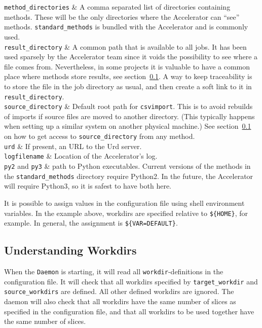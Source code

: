 \RPtwo \texttt{method\_directories} & A comma separated list of
directories containing methods.  These will be the only directories
where the Accelerator can ``see'' methods.  \texttt{standard\_methods}
is bundled with the Accelerator and is commonly used.\\[1ex]

\RPtwo \texttt{result\_directory} & A common path that is available to all
jobs.  It has been used sparsely by the Accelerator team since it
voids the possibility to see where a file comes from.  Nevertheless,
in some projects it is valuable to have a common place where methods
store results, see section~\ref{}.  A way to keep traceability is to
store the file in the job directory as usual, and then create a soft
link to it in \texttt{result\_directory}.\\[1ex]

\RPtwo \texttt{source\_directory} & Default root path for
\texttt{csvimport}.  This is to avoid rebuilds of imports if source
files are moved to another directory.  (This typically happens when
setting up a similar system on another physical machine.)  See
section~\ref{} on how to get access to \texttt{source\_directory} from
any method.\\[1ex]

\RPtwo \texttt{urd} & If present, an URL to the Urd server.\\[1ex]

\RPtwo \texttt{logfilename} & Location of the Accelerator's log.\\[1ex]

\RPtwo \texttt{py2} and \texttt{py3} & path to Python executables.
Current versions of the methods in the \texttt{standard\_methods}
directory require Python2.  In the future, the Accelerator will
require Python3, so it is safest to have both here.

\stoptabletwo

It is possible to assign values in the configuration file using shell
environment variables.  In the example above, workdirs are specified
relative to \texttt{\$\{HOME\}}, for example.  In general, the
assignment is \texttt{\$\{VAR=DEFAULT\}}.



\clearpage
\subsection{Understanding Workdirs}
When the \texttt{Daemon} is starting, it will read
all \texttt{workdir}-definitions in the configuration file.  It will
check that all workdirs specified by \texttt{target\_workdir}
and \texttt{source\_workdirs} are defined.  All other defined workdirs
are ignored.  The daemon will also check that all workdirs have the
same number of slices as specified in the configuration file, and that
all workdirs to be used together have the same number of slices.

